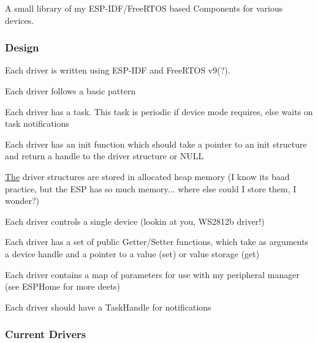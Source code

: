 A small library of my E\+S\+P-\/\+I\+D\+F/\+Free\+R\+T\+OS based Components for various devices.

\subsubsection*{Design}

Each driver is written using E\+S\+P-\/\+I\+DF and Free\+R\+T\+OS v9(?).

Each driver follows a basic pattern


\begin{DoxyItemize}
\item Each driver has a task. This task is periodic if device mode requires, else waits on task notifications
\item Each driver has an init function which should take a pointer to an init structure and return a handle to the driver structure or N\+U\+LL
\item \hyperlink{structThe}{The} driver structures are stored in allocated heap memory (I know it\textquotesingle{}s baad practice, but the E\+SP has so much memory... where else could I store them, I wonder?)
\item Each driver controls a single device (lookin at you, W\+S2812b driver!)
\item Each driver has a set of public Getter/\+Setter functions, which take as arguments a device handle and a pointer to a value (set) or value storage (get)
\item Each driver contains a map of parameters for use with my peripheral manager (see E\+S\+P\+Home for more deets)
\item Each driver should have a Task\+Handle for notifications
\end{DoxyItemize}

\subsubsection*{Current Drivers}


